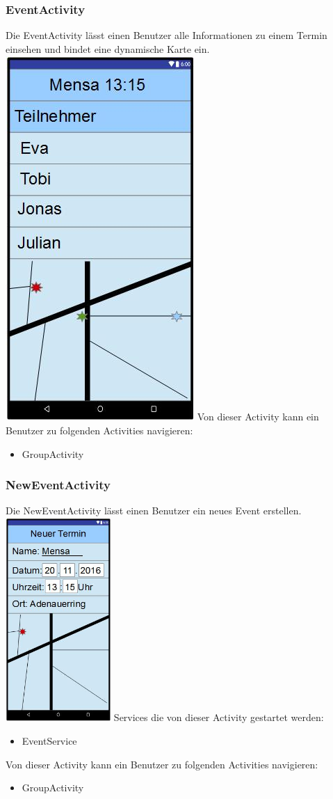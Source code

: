 	\subsubsection {EventActivity}
	Die EventActivity lässt einen Benutzer alle Informationen zu einem Termin einsehen und bindet eine dynamische Karte ein.
	\newline
	\includegraphics[width=.3\textwidth]{GUI_Termin.jpg}
	\newline
	Von dieser Activity kann ein Benutzer zu folgenden Activities navigieren:
	\begin{itemize} 
	 \item GroupActivity 
	 \end{itemize}
	 
	\subsubsection {NewEventActivity}
	Die NewEventActivity lässt einen Benutzer ein neues Event erstellen.
	\newline
	\includegraphics[width=0.3\textwidth]{GUI_NeuerTermin.jpg}
	\newline
	Services die von dieser Activity gestartet werden:
	\begin{itemize}
	\item EventService
	\end{itemize}
	Von dieser Activity kann ein Benutzer zu folgenden Activities navigieren:
	\begin{itemize} 
	 \item GroupActivity
	 \end{itemize}
	 \newpage
